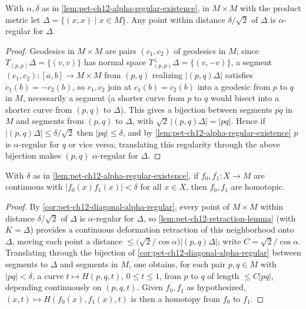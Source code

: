 \begin{corollary}
  \label{cor:pet-ch12-diagonal-alpha-regular}
  With $\alpha,\delta$ as in \cref{lem:pet-ch12-alpha-regular-existence}, in
  $M\times M$ with the product metric let $\Delta=\{(x,x)\mid x\in M\}$. Any
  point within distance $\delta/\sqrt2$ of $\Delta$ is $\alpha$-regular for
  $\Delta$.
\end{corollary}
\begin{proof}
  Geodesics in $M\times M$ are pairs $(c_1,c_2)$ of geodesics in $M$; since
  $T_{(p,p)}\Delta=\{(v,v)\}$ has normal space
  $T^\perp_{(p,p)}\Delta=\{(v,-v)\}$, a segment $(c_1,c_2):[a,b]\to M\times M$
  from $(p,q)$ realizing $|(p,q)\Delta|$ satisfies
  $\dot c_1(b)=-\dot c_2(b)$, so $c_1,c_2$ join at $c_1(b)=c_2(b)$ into a
  geodesic from $p$ to $q$ in $M$, necessarily a segment (a shorter curve from
  $p$ to $q$ would bisect into a shorter curve from $(p,q)$ to $\Delta$). This
  gives a bijection between segments $\overline{pq}$ in $M$ and segments from
  $(p,q)$ to $\Delta$, with $\sqrt2\,|(p,q)\Delta|=|pq|$. Hence if
  $|(p,q)\Delta|\le\delta/\sqrt2$ then $|pq|\le\delta$, and by
  \cref{lem:pet-ch12-alpha-regular-existence} $p$ is $\alpha$-regular for $q$ or
  vice versa; translating this regularity through the above bijection makes
  $(p,q)$ $\alpha$-regular for $\Delta$.
\end{proof}

\begin{corollary}
  \label{cor:pet-ch12-close-maps-homotopic}
  With $\delta$ as in \cref{lem:pet-ch12-alpha-regular-existence}, if
  $f_0,f_1:X\to M$ are continuous with $|f_0(x)f_1(x)|<\delta$ for all $x\in X$,
  then $f_0,f_1$ are homotopic.
\end{corollary}
\begin{proof}
  By \cref{cor:pet-ch12-diagonal-alpha-regular}, every point of $M\times M$
  within distance $\delta/\sqrt2$ of $\Delta$ is $\alpha$-regular for $\Delta$,
  so \cref{lem:pet-ch12-retraction-lemma} (with $K=\Delta$) provides a
  continuous deformation retraction of this neighborhood onto $\Delta$, moving
  each point a distance $\le\big(\sqrt2/\cos\alpha\big)|(p,q)\Delta|$; write
  $C=\sqrt2/\cos\alpha$. Translating through the bijection of
  \cref{cor:pet-ch12-diagonal-alpha-regular} between segments to $\Delta$ and
  segments in $M$, one obtains, for each pair $p,q\in M$ with $|pq|<\delta$, a
  curve $t\mapsto H(p,q,t)$, $0\le t\le1$, from $p$ to $q$ of length
  $\le C|pq|$, depending continuously on $(p,q,t)$. Given $f_0,f_1$ as
  hypothesized, $(x,t)\mapsto H(f_0(x),f_1(x),t)$ is then a homotopy from $f_0$
  to $f_1$.
\end{proof}

